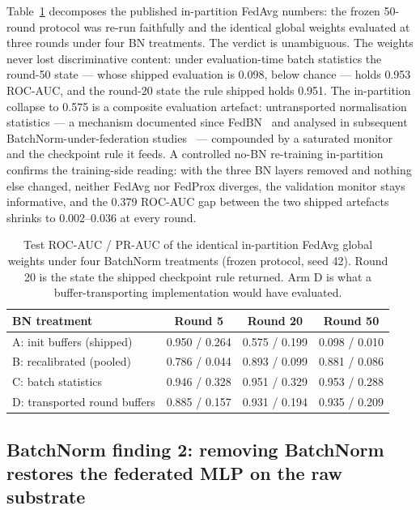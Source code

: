 Table~\ref{tab:bndiag} decomposes the published in-partition FedAvg
numbers: the frozen 50-round protocol was re-run faithfully and the
identical global weights evaluated at three rounds under four BN
treatments. The verdict is unambiguous. The weights never lost
discriminative content: under evaluation-time batch statistics the
round-50 state --- whose shipped evaluation is 0.098, below chance
--- holds 0.953 ROC-AUC, and the round-20 state the rule shipped
holds 0.951. The in-partition collapse to 0.575 is a composite
evaluation artefact: untransported normalisation statistics ---
a mechanism documented since FedBN~\cite{li2021fedbn} and analysed
in subsequent BatchNorm-under-federation
studies~\cite{wang2023bn,guerraoui2024bn,bnscaffold2024} ---
compounded by a saturated monitor and the checkpoint rule it feeds.
A controlled
no-BN re-training in-partition confirms the training-side reading:
with the three BN layers removed and nothing else changed, neither
FedAvg nor FedProx diverges, the validation monitor stays
informative, and the 0.379 ROC-AUC gap between the two shipped
artefacts shrinks to 0.002--0.036 at every round.

\begin{table}[t]
\centering
\caption{Test ROC-AUC / PR-AUC of the identical in-partition FedAvg
global weights under four BatchNorm treatments (frozen protocol,
seed 42). Round 20 is the state the shipped checkpoint rule
returned. Arm D is what a buffer-transporting implementation would
have evaluated.}
\label{tab:bndiag}
\small
\begin{tabular}{@{}l c c c@{}}
\toprule
\textbf{BN treatment} & \textbf{Round 5} & \textbf{Round 20} & \textbf{Round 50} \\
\midrule
A: init buffers (shipped) & 0.950 / 0.264 & 0.575 / 0.199 & 0.098 / 0.010 \\
B: recalibrated (pooled) & 0.786 / 0.044 & 0.893 / 0.099 & 0.881 / 0.086 \\
C: batch statistics & 0.946 / 0.328 & 0.951 / 0.329 & 0.953 / 0.288 \\
D: transported round buffers & 0.885 / 0.157 & 0.931 / 0.194 & 0.935 / 0.209 \\
\bottomrule
\end{tabular}
\end{table}

\subsection{BatchNorm finding 2: removing BatchNorm restores the
federated MLP on the raw substrate}

